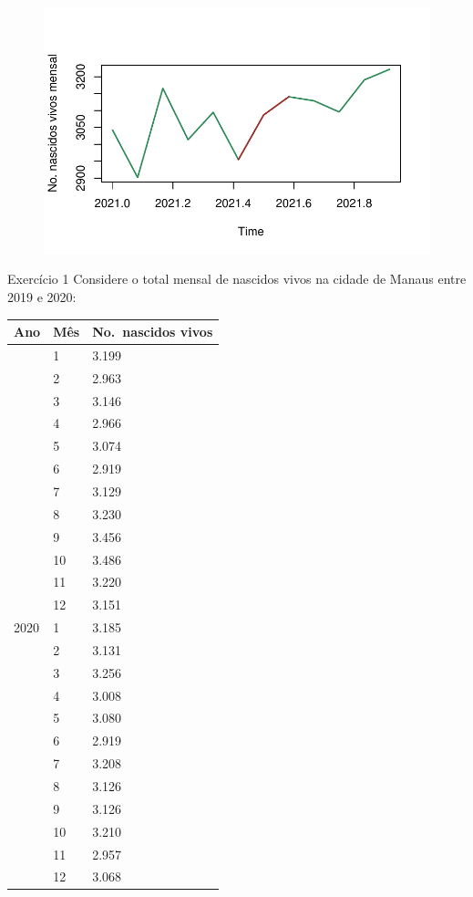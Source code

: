 \documentclass[
  letterpaper,
  DIV=11,
  numbers=noendperiod]{scrreprt}
\begin{document}
\begin{figure}[H]

{\centering \includegraphics{intro_files/figure-pdf/unnamed-chunk-4-1.pdf}

}

\end{figure}

Exercício 1 Considere o total mensal de nascidos vivos na cidade de
Manaus entre 2019 e 2020:

\begin{longtable}[]{@{}lll@{}}
\toprule\noalign{}
Ano & Mês & No.~nascidos vivos \\
\midrule\noalign{}
\endhead
\bottomrule\noalign{}
\endlastfoot
2019 & 1 & 3.199 \\
& 2 & 2.963 \\
& 3 & 3.146 \\
& 4 & 2.966 \\
& 5 & 3.074 \\
& 6 & 2.919 \\
& 7 & 3.129 \\
& 8 & 3.230 \\
& 9 & 3.456 \\
& 10 & 3.486 \\
& 11 & 3.220 \\
& 12 & 3.151 \\
2020 & 1 & 3.185 \\
& 2 & 3.131 \\
& 3 & 3.256 \\
& 4 & 3.008 \\
& 5 & 3.080 \\
& 6 & 2.919 \\
& 7 & 3.208 \\
& 8 & 3.126 \\
& 9 & 3.126 \\
& 10 & 3.210 \\
& 11 & 2.957 \\
& 12 & 3.068 \\
\end{longtable}
\end{document}
